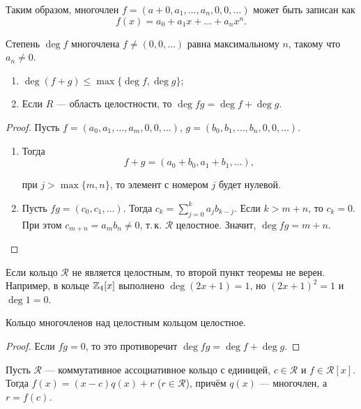 Таким образом, многочлен $f = (a+0, a_1, \ldots, a_n, 0, 0, \ldots)$ может быть записан как
$$
f(x) = a_0 + a_1x + \ldots + a_nx^n.
$$

\begin{definition}
    Степень $\deg f$ многочлена $f \ne (0, 0, \ldots)$ равна максимальному $n$, такому что $a_n \ne 0$.
\end{definition}

\begin{theorem}
    \begin{enumerate}[nolistsep]
        \item $\deg (f + g) \leqslant \max\{\deg f, \deg g\}$;
        \item Если $R$ --- область целостности, то $\deg fg = \deg f + \deg g$.
    \end{enumerate}
\end{theorem}

\begin{proof}
    Пусть $f = (a_0, a_1, \ldots, a_m, 0, 0, \ldots)$, $g = (b_0, b_1, \ldots, b_n, 0, 0, \ldots)$. 
    \begin{enumerate}
        \item Тогда 
            $$
            f + g = (a_0 + b_0, a_1 + b_1, \ldots),
            $$

            при $j > \max\{m, n\}$, то элемент с номером $j$ будет нулевой.
        \item Пусть $fg = (c_0, c_1, \ldots)$. Тогда $c_k = \sum\limits_{j = 0}^ka_jb_{k - j}$. Если $k > m + n$, то $c_k = 0$. При этом $c_{m + n} = a_mb_n \ne 0$, т.\,к. $\mathcal{R}$ целостное. Значит, $\deg fg = m + n$.
    \end{enumerate}
\end{proof}

\begin{remark}
    Если кольцо $\mathcal{R}$ не является целостным, то второй пункт теоремы не верен. Например, в кольце $\mathbb{Z}_4[x]$ выполнено $\deg(2x + 1) = 1$, но $(2x + 1)^2 = 1$ и $\deg 1 = 0$.
\end{remark}

\begin{theorem}
    Кольцо многочленов над целостным кольцом целостное.
\end{theorem}

\begin{proof}
    Если $fg = 0$, то это противоречит $\deg fg = \deg f + \deg g$.
\end{proof}

\begin{theorem}[Безу]
    Пусть $\mathcal{R}$ --- коммутативное ассоциативное кольцо с единицей, $c \in \mathcal{R}$ и $f \in \mathcal{R}[x]$. Тогда $f(x) = (x - c)q(x) + r$ ($r \in \mathcal{R}$), причём $q(x)$ --- многочлен, а $r = f(c)$.
\end{theorem}

